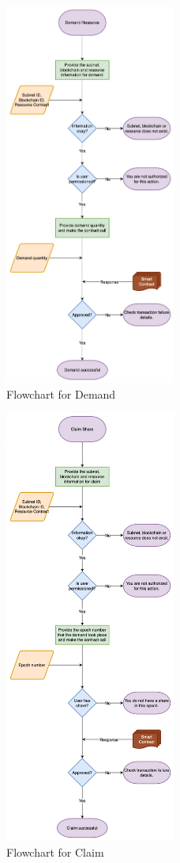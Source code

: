 \documentclass[a4paper,12pt]{report}
\begin{document}
\begin{figure}[H]
	\centering
	\includegraphics[width=0.5\textwidth]{flow3.png}
		\caption{Flowchart for Demand}
\end{figure}
\begin{figure}[H]
	\centering
	\includegraphics[width=0.5\textwidth]{flow4.png}
	\caption{Flowchart for Claim}
\end{figure}
\end{document}
